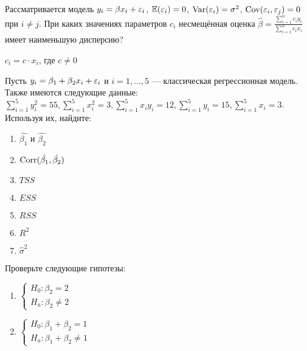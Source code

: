 \documentclass[pdftex,11pt,openany]{book}
\begin{document}
\begin{solution}
\end{solution}


\begin{problem}
 Рассматривается модель $y_i=\beta x_i+\varepsilon_i$, $\mathbb{E}(\varepsilon_i)=0$, $\operatorname{Var}(\varepsilon_i)=\sigma^2$, $\operatorname{Cov}(\varepsilon_i,\varepsilon_j)=0$ при $i \ne j$. 
При каких значениях параметров $c_i$ несмещённая оценка $\hat{\beta}=\frac{\sum_{i=1}^n {c_i y_i}}{\sum_{i=1}^n {c_i x_i}}$ имеет наименьшую дисперсию? 
\end{problem}
 
\begin{solution}
$c_i=c\cdot x_i$, где $c\neq 0$ 
\end{solution}


\begin{problem}
 Пусть $y_i = \beta_1 + \beta_2 x_i + \varepsilon_i$ и $i = 1, \dots, 5$ --- классическая регрессионная модель. Также имеются следующие данные: $\sum_{i=1}^5 y_i^2 = 55, \sum_{i=1}^5 x_i^2 = 3, \sum_{i=1}^5 x_iy_i = 12, \sum_{i=1}^5 y_i = 15, \sum_{i=1}^5 x_i = 3.$ Используя их, найдите:

\begin{enumerate}
\item $\hat{\beta_1}$ и $\hat{\beta_2}$
\item $\operatorname{Corr}(\hat{\beta_1}, \hat{\beta_2})$
\item $TSS$
\item $ESS$
\item $RSS$
\item $R^2$
\item $\hat{\sigma}^2$
\end{enumerate}

Проверьте следующие гипотезы:
\begin{enumerate}
\item $\begin{cases}  H_0: \beta_2 = 2  \\ H_a: \beta_2 \not= 2 \end{cases}$
\item $\begin{cases}  H_0: \beta_1 + \beta_2 = 1  \\ H_a: \beta_1 + \beta_2 \not= 1 \end{cases}$
\end{enumerate}
\end{problem}

\begin{solution}
\end{solution}
\end{document}
